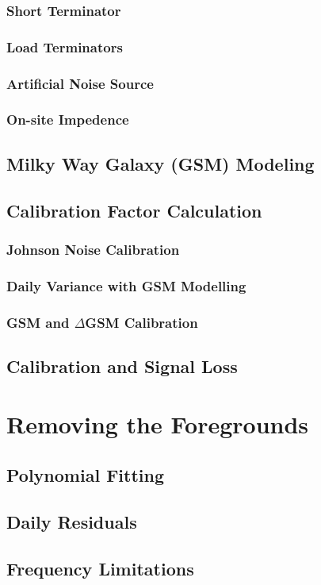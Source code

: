 \subsubsection{Short Terminator}

\subsubsection{Load Terminators}

\subsubsection{Artificial Noise Source}

\subsubsection{On-site Impedence}

\subsection{Milky Way Galaxy (GSM) Modeling}

\subsection{Calibration Factor Calculation}

\subsubsection{Johnson Noise Calibration}

\subsubsection{Daily Variance with GSM Modelling}

\subsubsection{GSM and $\Delta$GSM Calibration}

\subsection{Calibration and Signal Loss}

\section{Removing the Foregrounds}

\subsection{Polynomial Fitting}

\subsection{Daily Residuals}

\subsection{Frequency Limitations}

